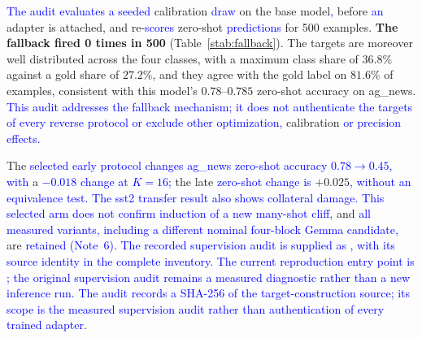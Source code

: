 \documentclass[11pt]{article}
\begin{document}
\textcolor{blue}{The audit evaluates a seeded} calibration \textcolor{blue}{draw} on the base model\textcolor{blue}{,} before \textcolor{blue}{an}
adapter is attached, and re-\textcolor{blue}{scores} zero-shot \textcolor{blue}{predictions} for 500 examples.
\textbf{The fallback fired 0 times in 500}
(Table~\ref{stab:fallback}). The targets are moreover well distributed across the four
classes, with a maximum class share of $36.8\%$ against a gold share of $27.2\%$, and they
agree with the gold label on $81.6\%$ of examples, consistent with this model's $0.78$--$0.785$
zero-shot accuracy on ag\_news. \textcolor{blue}{This audit addresses the fallback mechanism;
it does not authenticate the targets of every reverse protocol or
exclude other optimization,} calibration \textcolor{blue}{or precision effects.}

The \textcolor{blue}{selected early protocol changes ag\_}\textcolor{blue}{news zero-shot accuracy $0.78\to0.45$, with} a
\textcolor{blue}{$-0.018$ change at $K{=}16$;} the late \textcolor{blue}{zero-shot change is} $+0.025$\textcolor{blue}{, without an equivalence
test. The sst2 transfer result also shows collateral damage. This selected arm does not
confirm induction of a new many-shot cliff}, and \textcolor{blue}{all measured variants, including a
different nominal four-block Gemma candidate,} are \textcolor{blue}{retained (Note}~\textcolor{blue}{6)}. \textcolor{blue}{The recorded supervision audit is supplied as , with its source identity in the complete inventory. The current reproduction entry point is ; the original supervision audit remains a measured diagnostic rather than a new inference run.}
\textcolor{blue}{The audit records a SHA-256 of the target-construction source; its scope is
the measured supervision audit rather than authentication of every trained adapter.}
\end{document}
